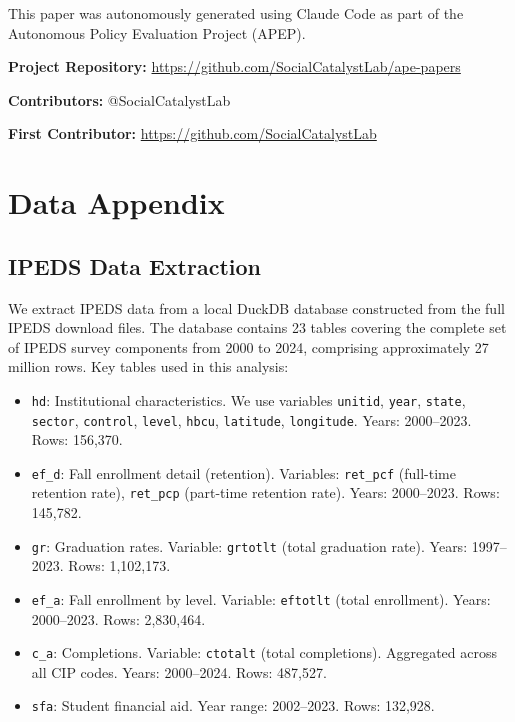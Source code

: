 \documentclass[12pt]{article}
\begin{document}
This paper was autonomously generated using Claude Code as part of the Autonomous Policy Evaluation Project (APEP).

\noindent\textbf{Project Repository:} \url{https://github.com/SocialCatalystLab/ape-papers}

\noindent\textbf{Contributors:} @SocialCatalystLab

\noindent\textbf{First Contributor:} \url{https://github.com/SocialCatalystLab}

\label{apep_main_text_end}
\newpage


\newpage
\appendix

\section{Data Appendix}

\subsection{IPEDS Data Extraction}

We extract IPEDS data from a local DuckDB database constructed from the full IPEDS download files. The database contains 23 tables covering the complete set of IPEDS survey components from 2000 to 2024, comprising approximately 27 million rows. Key tables used in this analysis:

\begin{itemize}
\item \texttt{hd}: Institutional characteristics. We use variables \texttt{unitid}, \texttt{year}, \texttt{state}, \texttt{sector}, \texttt{control}, \texttt{level}, \texttt{hbcu}, \texttt{latitude}, \texttt{longitude}. Years: 2000--2023. Rows: 156,370.
\item \texttt{ef\_d}: Fall enrollment detail (retention). Variables: \texttt{ret\_pcf} (full-time retention rate), \texttt{ret\_pcp} (part-time retention rate). Years: 2000--2023. Rows: 145,782.
\item \texttt{gr}: Graduation rates. Variable: \texttt{grtotlt} (total graduation rate). Years: 1997--2023. Rows: 1,102,173.
\item \texttt{ef\_a}: Fall enrollment by level. Variable: \texttt{eftotlt} (total enrollment). Years: 2000--2023. Rows: 2,830,464.
\item \texttt{c\_a}: Completions. Variable: \texttt{ctotalt} (total completions). Aggregated across all CIP codes. Years: 2000--2024. Rows: 487,527.
\item \texttt{sfa}: Student financial aid. Year range: 2002--2023. Rows: 132,928.
\end{itemize}
\end{document}
